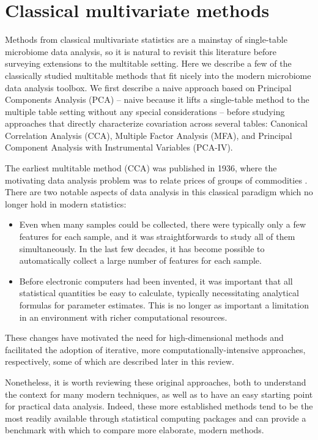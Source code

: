 \documentclass{article}
\begin{document}
\section{Classical multivariate methods}

Methods from classical multivariate statistics are a mainstay of single-table
microbiome data analysis, so it is natural to revisit this literature before
surveying extensions to the multitable setting. Here we describe a few of the
classically studied multitable methods that fit nicely into the modern
microbiome data analysis toolbox. We first describe a naive approach based on
Principal Components Analysis (PCA) -- naive because it lifts a single-table
method to the multiple table setting without any special considerations --
before studying approaches that directly characterize covariation across several
tables: Canonical Correlation Analysis (CCA), Multiple Factor Analysis (MFA),
and Principal Component Analysis with Instrumental Variables (PCA-IV).

The earliest multitable method (CCA) was published in 1936, where the motivating
data analysis problem was to relate prices of groups of commodities
\citep{hotelling1936relations}. There are two notable aspects of data analysis in
this classical paradigm which no longer hold in modern statistics:
\begin{itemize}
  \item Even when many samples could be collected, there were typically only a
    few features for each sample, and it was straightforwards to study all of
    them simultaneously. In the last few decades, it has become possible to
    automatically collect a large number of features for each sample.
  \item Before electronic computers had been invented, it was important that all
    statistical quantities be easy to calculate, typically necessitating
    analytical formulas for parameter estimates. This is no longer as important
    a limitation in an environment with richer computational resources.
\end{itemize}

These changes have motivated the need for high-dimensional methods and
facilitated the adoption of iterative, more computationally-intensive
approaches, respectively, some of which are described later in this review.

Nonetheless, it is worth reviewing these original approaches, both to understand
the context for many modern techniques, as well as to have an easy starting
point for practical data analysis. Indeed, these more established methods tend
to be the most readily available through statistical computing packages and can
provide a benchmark with which to compare more elaborate, modern methods.
\end{document}
